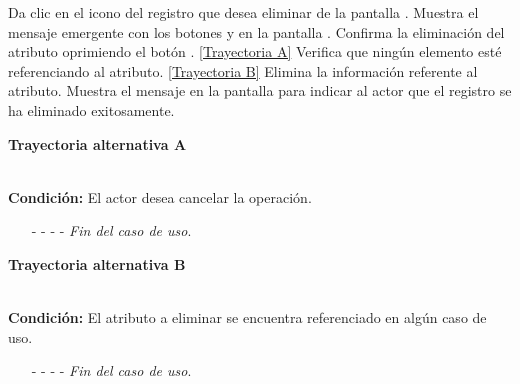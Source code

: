 	\begin{UCtrayectoria}
		\UCpaso[\UCactor] Da clic en el icono \eliminar del registro que desea eliminar de la pantalla .
		\UCpaso[\UCsist] Muestra el mensaje emergente  con los botones  y  en la pantalla  .
		\UCpaso[\UCactor] Confirma la eliminación del atributo oprimiendo el botón . \hyperlink{CU7-1-1-3:TAA}{[Trayectoria A]}
		\UCpaso[\UCsist] Verifica que ningún elemento esté referenciando al atributo. \hyperlink{CU7-1-1-3:TAB}{[Trayectoria B]}
		\UCpaso[\UCsist] Elimina la información referente al atributo.
		\UCpaso[\UCsist] Muestra el mensaje  en la pantalla  para indicar al actor que el registro se ha eliminado exitosamente.
	\end{UCtrayectoria}	
	\hypertarget{CU7-1-1-3:TAA}{\textbf{Trayectoria alternativa A}}\\
	\noindent \textbf{Condición:} El actor desea cancelar la operación.
	\begin{enumerate}
		\UCpaso[\UCactor] Oprime el botón  de la pantalla emergente.
		\UCpaso[\UCsist] Muestra la pantalla .
		\item[- -] - - {\em {Fin del caso de uso}}.%
	\end{enumerate}

	\hypertarget{CU7-1-1-3:TAB}{\textbf{Trayectoria alternativa B}}\\
	\noindent \textbf{Condición:} El atributo a eliminar se encuentra referenciado en algún caso de uso.
	\begin{enumerate}
		\UCpaso[\UCsist] Muestra el mensaje  en la pantalla .
		\item[- -] - - {\em {Fin del caso de uso}}.
	\end{enumerate}
